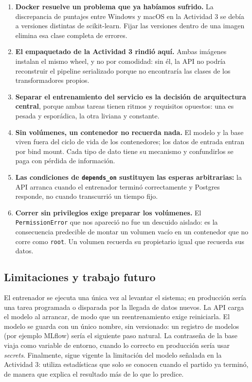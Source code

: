 \documentclass[12pt,a4paper]{article}
\begin{document}
\begin{enumerate}
\item \textbf{Docker resuelve un problema que ya hab\'iamos sufrido.} La discrepancia de puntajes
entre Windows y macOS en la Actividad 3 se deb\'ia a versiones distintas de scikit-learn. Fijar
las versiones dentro de una imagen elimina esa clase completa de errores.

\item \textbf{El empaquetado de la Actividad 3 rindi\'o aqu\'i.} Ambas im\'agenes instalan el
mismo wheel, y no por comodidad: sin \'el, la API no podr\'ia reconstruir el pipeline serializado
porque no encontrar\'ia las clases de los transformadores propios.

\item \textbf{Separar el entrenamiento del servicio es la decisi\'on de arquitectura central},
porque ambas tareas tienen ritmos y requisitos opuestos: una es pesada y espor\'adica, la otra
liviana y constante.

\item \textbf{Sin vol\'umenes, un contenedor no recuerda nada.} El modelo y la base viven fuera
del ciclo de vida de los contenedores; los datos de entrada entran por bind mount. Cada tipo de
dato tiene su mecanismo y confundirlos se paga con p\'erdida de informaci\'on.

\item \textbf{Las condiciones de \texttt{depends\_on} sustituyen las esperas arbitrarias:} la API
arranca cuando el entrenador termin\'o correctamente y Postgres responde, no cuando transcurri\'o
un tiempo fijo.

\item \textbf{Correr sin privilegios exige preparar los vol\'umenes.} El \texttt{PermissionError}
que nos apareci\'o no fue un descuido aislado: es la consecuencia predecible de montar un volumen
vac\'io en un contenedor que no corre como \texttt{root}. Un volumen recuerda su propietario igual
que recuerda sus datos.
\end{enumerate}

\subsection*{Limitaciones y trabajo futuro}

El entrenador se ejecuta una \'unica vez al levantar el sistema; en producci\'on ser\'ia una tarea
programada o disparada por la llegada de datos nuevos. La API carga el modelo al arrancar, de modo
que un reentrenamiento exige reiniciarla. El modelo se guarda con un \'unico nombre, sin
versionado: un registro de modelos (por ejemplo MLflow) ser\'ia el siguiente paso natural. La
contrase\~na de la base viaja como variable de entorno, cuando lo correcto en producci\'on ser\'ia
usar \emph{secrets}. Finalmente, sigue vigente la limitaci\'on del modelo se\~nalada en la
Actividad 3: utiliza estad\'isticas que solo se conocen cuando el partido ya termin\'o, de manera
que explica el resultado m\'as de lo que lo predice.
\end{document}

